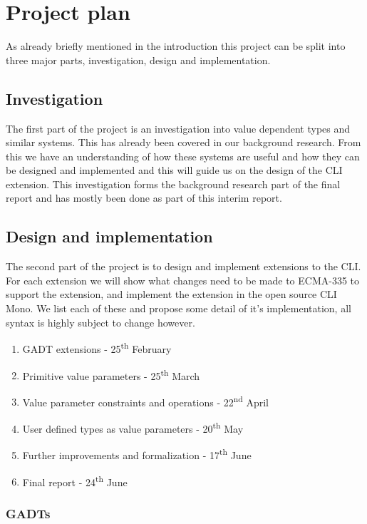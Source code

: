 
\chapter{Project plan}

As already briefly mentioned in the introduction this project can
be split into three major parts, investigation, design and implementation.


\section{Investigation}

The first part of the project is an investigation into value dependent
types and similar systems. This has already been covered in our background
research. From this we have an understanding of how these systems
are useful and how they can be designed and implemented and this will
guide us on the design of the CLI extension. This investigation forms
the background research part of the final report and has mostly been
done as part of this interim report.


\section{Design and implementation}

The second part of the project is to design and implement extensions
to the CLI. For each extension we will show what changes need to be
made to ECMA-335 to support the extension, and implement the extension
in the open source CLI Mono. We list each of these and propose some
detail of it's implementation, all syntax is highly subject to change
however.
\begin{enumerate}
\item GADT extensions - 25\textsuperscript{th} February
\item Primitive value parameters - 25\textsuperscript{th} March
\item Value parameter constraints and operations - 22\textsuperscript{nd}
April
\item User defined types as value parameters - 20\textsuperscript{th} May
\item Further improvements and formalization - 17\textsuperscript{th} June
\item Final report - 24\textsuperscript{th} June
\end{enumerate}

\subsection{GADTs}

